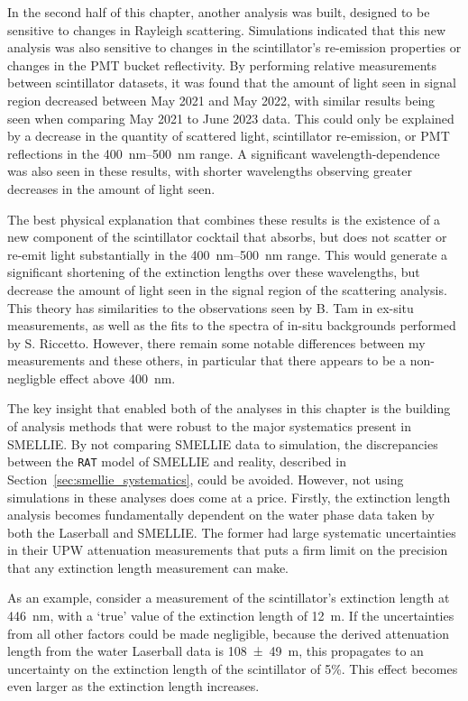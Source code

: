 In the second half of this chapter, another analysis was built, designed to be sensitive to changes in Rayleigh scattering. Simulations indicated that this new analysis was also sensitive to changes in the scintillator's  re-emission properties or changes in the PMT bucket reflectivity. By performing relative measurements between scintillator datasets, it was found that the amount of light seen in signal region decreased between May 2021 and May 2022, with similar results being seen when comparing May 2021 to June 2023 data. This could only be explained by a decrease in the quantity of scattered light, scintillator re-emission, or PMT reflections in the \SIrange{400}{500}{\nm} range. A significant wavelength-dependence was also seen in these results, with shorter wavelengths observing greater decreases in the amount of light seen.

The best physical explanation that combines these results is the existence of a new component of the scintillator cocktail that absorbs, but does not scatter or re-emit light substantially in the \SIrange{400}{500}{\nm} range. This would generate a significant shortening of the extinction lengths over these wavelengths, but decrease the amount of light seen in the signal region of the scattering analysis. This theory has similarities to the observations seen by B. Tam in ex-situ measurements, as well as the fits to the spectra of in-situ backgrounds performed by S. Riccetto. However, there remain some notable differences between my measurements and these others, in particular that there appears to be a non-negligble effect above \SI{400}{\nm}.

The key insight that enabled both of the analyses in this chapter is the building of analysis methods that were robust to the major systematics present in SMELLIE. By not comparing SMELLIE data to simulation, the discrepancies between the \texttt{RAT} model of SMELLIE and reality, described in Section~\ref{sec:smellie_systematics}, could be avoided. However, not using simulations in these analyses does come at a price. Firstly, the extinction length analysis becomes fundamentally dependent on the water phase data taken by both the Laserball and SMELLIE. The former had large systematic uncertainties in their UPW attenuation measurements that puts a firm limit on the precision that any extinction length measurement can make.

As an example, consider a measurement of the scintillator's extinction length at \SI{446}{\nm}, with a `true' value of the extinction length of \SI{12}{\m}. If the uncertainties from all other factors could be made negligible, because the derived attenuation length from the water Laserball data is \SI{108(49)}{\m}, this propagates to an uncertainty on the extinction length of the scintillator of 5\%. This effect becomes even larger as the extinction length increases.

